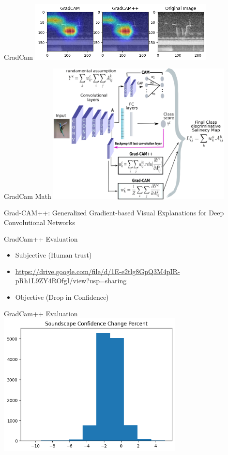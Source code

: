 \begin{frame}{GradCam}
    \centering
    \includegraphics[height=0.7\textheight,width=0.7\textwidth,keepaspectratio]{./images/screaming_gradcam_1.png}

\end{frame}
\begin{frame}{GradCam Math}
    \centering
    \includegraphics[height=0.7\textheight,width=0.7\textwidth,keepaspectratio]{./images/grad_cam_explination.png}

    Grad-CAM++: Generalized Gradient-based Visual Explanations for Deep Convolutional Networks
\end{frame}
\begin{frame}{GradCam++ Evaluation}
    \begin{itemize}
        \item Subjective (Human trust)
        \item \url{https://drive.google.com/file/d/1E-e2tlg8GpQ3M4pIR-pRh1L9ZY4ROfgI/view?usp=sharing}
        \item Objective (Drop in Confidence)
    \end{itemize}
\end{frame}
\begin{frame}{GradCam++ Evaluation}
    \centering
    \includegraphics[height=0.7\textheight,width=0.7\textwidth,keepaspectratio]{./images/Soundscape_Confidence.png}
\end{frame}
